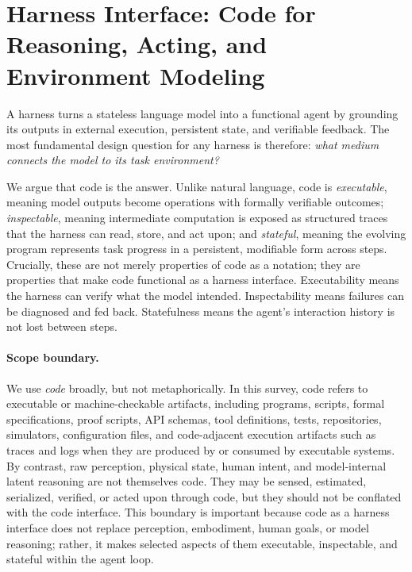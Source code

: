 
\section{Harness Interface: Code for Reasoning, Acting, and
Environment Modeling}
\label{sec:foundations}

A harness turns a stateless language model into a functional 
agent by grounding its outputs in external execution, persistent 
state, and verifiable feedback. The most fundamental design 
question for any harness is therefore: \emph{what medium 
connects the model to its task environment?}

We argue that code is the answer. Unlike natural language, code 
is \emph{executable}, meaning model outputs become operations 
with formally verifiable outcomes; \emph{inspectable}, meaning 
intermediate computation is exposed as structured traces that 
the harness can read, store, and act upon; and \emph{stateful}, 
meaning the evolving program represents task progress in a 
persistent, modifiable form across steps. Crucially, these are 
not merely properties of code as a notation; they are properties 
that make code functional as a harness interface. Executability 
means the harness can verify what the model intended. 
Inspectability means failures can be diagnosed and fed back. 
Statefulness means the agent's interaction history is not lost 
between steps.


\paragraph{Scope boundary.}
We use \emph{code} broadly, but not metaphorically. In this
survey, code refers to executable or machine-checkable artifacts,
including programs, scripts, formal specifications, proof scripts,
API schemas, tool definitions, tests, repositories, simulators,
configuration files, and code-adjacent execution artifacts such as
traces and logs when they are produced by or consumed by executable
systems. By contrast, raw perception, physical state, human intent,
and model-internal latent reasoning are not themselves code.
They may be sensed, estimated, serialized, verified, or acted upon
through code, but they should not be conflated with the code
interface. This boundary is important because code as a harness
interface does not replace perception, embodiment, human goals, or
model reasoning; rather, it makes selected aspects of them
executable, inspectable, and stateful within the agent loop.

